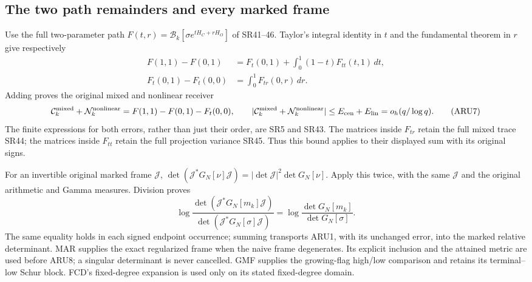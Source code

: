 \documentclass[11pt,a4paper]{article}
\begin{document}
\subsection{The two path remainders and every marked frame}
Use the full two-parameter path
$F(t,r)=\mathcal B_k[\sigma e^{tH_C+rH_O}]$ of SR41--46.
Taylor's integral identity in $t$ and the fundamental theorem in $r$
give respectively
\[
\begin{split}
 F(1,1)-F(0,1)&=F_t(0,1)+
                  \int_0^1(1-t)F_{tt}(t,1)\,dt,\\
 F_t(0,1)-F_t(0,0)&=\int_0^1F_{tr}(0,r)\,dr.
\end{split}\tag{ARU6}
\]
Adding proves the original mixed and nonlinear receiver
\[
 \mathcal C_k^{\rm mixed}+\mathcal N_k^{\rm nonlinear}
 =F(1,1)-F(0,1)-F_t(0,0),\qquad
 |\mathcal C_k^{\rm mixed}+\mathcal N_k^{\rm nonlinear}|
 \le E_{\rm cen}+E_{\rm lin}=o_h(q/\log q).
 \tag{ARU7}
\]
The finite expressions for both errors, rather than just their order,
are SR5 and SR43. The matrices inside $F_{tr}$ retain the full
mixed trace SR44; the matrices inside $F_{tt}$ retain the full
projection variance SR45. Thus this bound applies to their displayed
sum with its original signs.

For an invertible original marked frame $\mathcal J$,
$\det(\mathcal J^*G_N[\nu]\mathcal J)=
 |\det\mathcal J|^2\det G_N[\nu]$. Apply this twice, with the same
$\mathcal J$ and the original arithmetic and Gamma measures. Division
proves
\[
 \log\frac{\det(\mathcal J^*G_N[m_k]\mathcal J)}
                 {\det(\mathcal J^*G_N[\sigma]\mathcal J)}
 =\log\frac{\det G_N[m_k]}{\det G_N[\sigma]}.
 \tag{ARU8}
\]
The same equality holds in each signed endpoint occurrence; summing
transports ARU1, with its unchanged error, into the marked relative
determinant. MAR supplies the exact regularized frame when the naive
frame degenerates. Its explicit inclusion and the attained metric are
used before ARU8; a singular determinant is never cancelled.
GMF supplies the growing-flag high/low comparison and retains its
terminal--low Schur block. FCD's fixed-degree expansion is used only
on its stated fixed-degree domain.
\end{document}
